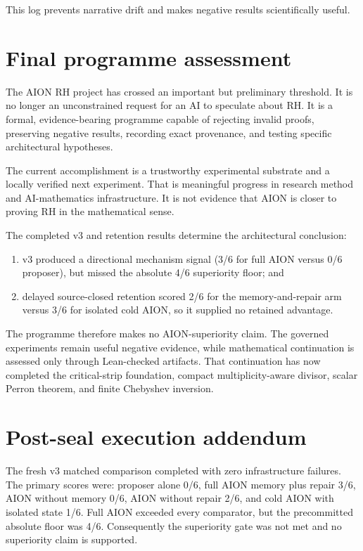 \documentclass[11pt,a4paper]{article}
\begin{document}
This log prevents narrative drift and makes negative results scientifically
useful.

\section{Final programme assessment}

The AION RH project has crossed an important but preliminary threshold. It is
no longer an unconstrained request for an AI to speculate about RH. It is a
formal, evidence-bearing programme capable of rejecting invalid proofs,
preserving negative results, recording exact provenance, and testing specific
architectural hypotheses.

The current accomplishment is a trustworthy experimental substrate and a
locally verified next experiment. That is meaningful progress in research
method and AI-mathematics infrastructure. It is not evidence that AION is
closer to proving RH in the mathematical sense.

The completed v3 and retention results determine the architectural conclusion:

\begin{enumerate}
  \item v3 produced a directional mechanism signal (3/6 for full AION versus
  0/6 proposer), but missed the absolute 4/6 superiority floor; and
  \item delayed source-closed retention scored 2/6 for the memory-and-repair arm
  versus 3/6 for isolated cold AION, so it supplied no retained advantage.
\end{enumerate}

The programme therefore makes no AION-superiority claim. The governed
experiments remain useful negative evidence, while mathematical continuation
is assessed only through Lean-checked artifacts. That continuation has now
completed the critical-strip foundation, compact multiplicity-aware divisor,
scalar Perron theorem, and finite Chebyshev inversion.

\section{Post-seal execution addendum}

The fresh v3 matched comparison completed with zero infrastructure failures.
The primary scores were: proposer alone 0/6, full AION memory plus repair 3/6,
AION without memory 0/6, AION without repair 2/6, and cold AION with isolated
state 1/6. Full AION exceeded every comparator, but the precommitted absolute
floor was 4/6. Consequently the superiority gate was not met and no superiority
claim is supported.
\end{document}
